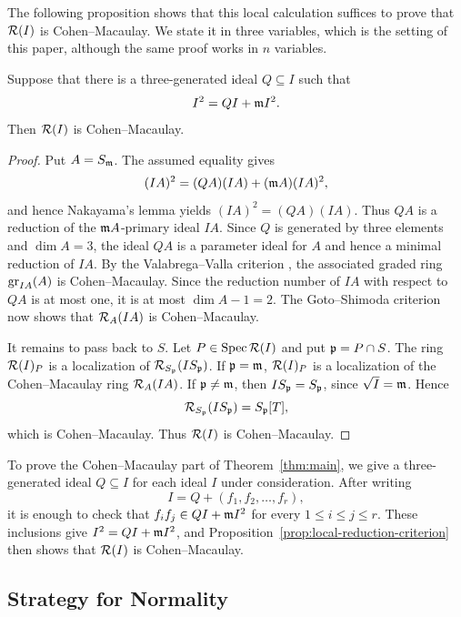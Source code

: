 The following proposition shows that this local calculation suffices to prove that $\mathcal R(I)$ is Cohen--Macaulay.  We state it in three variables, which is the setting of this paper, although the same proof works in $n$ variables.

\begin{proposition}
\label{prop:local-reduction-criterion}
Suppose that there is a three-generated ideal $Q\subseteq I$ such that
\[
 I^2=QI+\mathfrak m I^2.
\]
Then $\mathcal R(I)$ is Cohen--Macaulay.
\end{proposition}

\begin{proof}
Put $A=S_\mathfrak m$.  The assumed equality
gives
\[
 (IA)^2=(QA)(IA)+(\mathfrak m A)(IA)^2,
\]
and hence Nakayama's lemma yields $(IA)^2=(QA)(IA)$.  Thus $QA$ is a
reduction of the $\mathfrak m A$-primary ideal $IA$.  Since $Q$ is generated by three
elements and $\dim A=3$, the ideal $QA$ is a parameter ideal for $A$ and
hence a minimal reduction of $IA$.
By the Valabrega--Valla criterion \cite[Proposition~3.1]{ValabregaValla1978}, the
associated graded ring $\operatorname{gr}_{IA}(A)$ is Cohen--Macaulay.  Since the reduction
number of $IA$ with respect to $QA$ is at most one, it is at most
$\dim A-1=2$.  The Goto--Shimoda criterion
\cite[Theorem~3.1]{GotoShimoda1982} now shows
that $\mathcal R_A(IA)$ is Cohen--Macaulay.

It remains to pass back to $S$.  Let $P\in\operatorname{Spec}\mathcal R(I)$ and put
$\mathfrak{p}=P\cap S$.  The ring $\mathcal R(I)_P$ is a localization of
$\mathcal R_{S_{\mathfrak{p}}}(IS_{\mathfrak{p}})$.  If $\mathfrak{p}=\mathfrak m$, $\mathcal R(I)_P$ is a localization of the
Cohen--Macaulay ring $\mathcal R_A(IA)$.  If $\mathfrak{p}\ne\mathfrak m$, then
$IS_{\mathfrak{p}}=S_{\mathfrak{p}}$, since $\sqrt I=\mathfrak m$.  Hence
\[
 \mathcal R_{S_{\mathfrak{p}}}(IS_{\mathfrak{p}})=S_{\mathfrak{p}}[T],
\]
which is Cohen--Macaulay.  Thus $\mathcal R(I)$ is Cohen--Macaulay.
\end{proof}


To prove the Cohen--Macaulay part of Theorem~\ref{thm:main}, we give a three-generated ideal $Q\subseteq I$ for each ideal $I$ under consideration.
After writing
\[
 I=Q+(f_1,f_2,\ldots,f_r),
\]
it is enough to check that $f_if_j\in QI+\mathfrak m I^2$ for every $1\leq i\leq j\leq r$.  These inclusions give $I^2=QI+\mathfrak m I^2$, and Proposition~\ref{prop:local-reduction-criterion} then shows that $\mathcal R(I)$ is Cohen--Macaulay.


\subsection{Strategy for Normality}
\label{subsec:normality}

